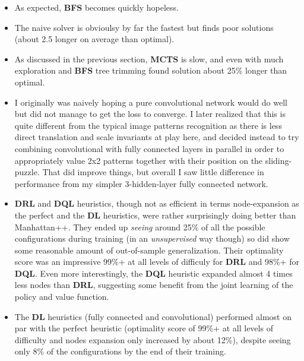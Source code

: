 \begin{itemize}
\item As expected, \textbf{BFS} becomes quickly hopeless.
\item The naive solver is obvioulsy by far the fastest but finds poor solutions (about 2.5 longer on average than optimal).
\item As discussed in the previous section, \textbf{MCTS} is slow, and even with much exploration and \textbf{BFS} tree trimming found solution about 25\% longer than optimal.
\item I originally was naively hoping a pure convolutional network would do well but did not manage to get the loss to converge. I later realized that this is quite different from the typical image patterns recognition as there is less direct translation and scale invariants at play here, and decided instead to try combining convolutional with fully connected layers in parallel in order to appropriately value 2x2 patterns together with their position on the sliding-puzzle. That did improve things, but overall I saw little difference in performance from my simpler 3-hidden-layer fully connected network.
\item \textbf{DRL} and \textbf{DQL} heuristics, though not as efficient in terms node-expansion as the perfect and the \textbf{DL} heuristics, were rather surprisingly doing better than Manhattan++. They ended up \textit{seeing} around 25\% of all the possible configurations during training (in an \textit{unsupervised} way though) so did show some reasonable amount of out-of-sample generalization. Their optimality score was an impressive 99\%+ at all levels of difficuly for \textbf{DRL} and 98\%+ for \textbf{DQL}. Even more interestingly, the \textbf{DQL} heuristic expanded almost 4 times less nodes than \textbf{DRL}, suggesting some benefit from the joint learning of the policy and value function.
\item The \textbf{DL} heuristics (fully connected and convolutional) performed almost on par with the perfect heuristic (optimality score of 99\%+ at all levels of difficulty and nodes expansion only increased by about 12\%), despite seeing only 8\% of the configurations by the end of their training.
\end{itemize}


